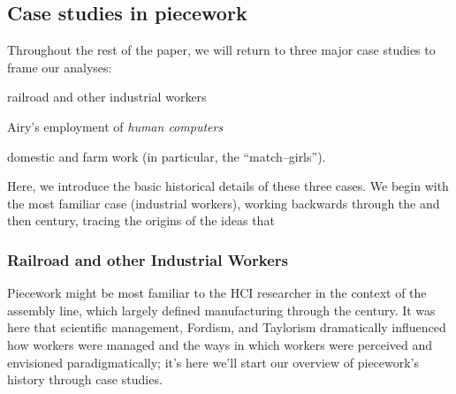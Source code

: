 \documentclass[trackingWork]{subfiles}
\begin{document}
\subsection{Case studies in piecework}
Throughout the rest of the paper, we will return to three major case studies to frame our analyses:
\begin{numberlist}[itemjoin*={;~and~},itemjoin={;~}]
  \item railroad and other industrial workers
  \item Airy's employment of \textit{human computers}
  \item domestic and farm work (in particular, the ``match--girls'').
\end{numberlist}
Here, we introduce the basic historical details of these three cases.
We begin with the most familiar case (industrial workers),
working backwards through the  and then  century,
tracing the origins of the ideas that 







\onlyinsubfile{\clearpage}
\subsubsection{Railroad and other Industrial Workers}
{Piecework might be most familiar to the HCI researcher in the context of the assembly line, which largely defined manufacturing through the  century.}
It was here that
scientific management, Fordism, and Taylorism
dramatically influenced how workers were managed and
the ways in which workers were perceived and envisioned paradigmatically;
it's here we'll start our overview of piecework's history through case studies. 
\end{document}

